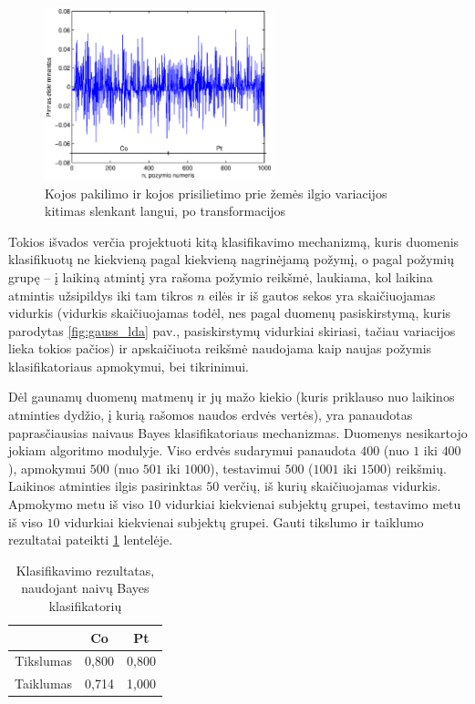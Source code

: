 \documentclass[]{vgtuef}
\begin{document}
\begin{figure}
	\centering
	\includegraphics[width=250px]{figures/11_sample_testing}
	\caption{Kojos pakilimo ir kojos prisilietimo prie žemės ilgio variacijos kitimas slenkant langui, po transformacijos}
	\label{fig:testing_sample}
\end{figure}

Tokios išvados verčia projektuoti kitą klasifikavimo mechanizmą, kuris duomenis klasifikuotų ne kiekvieną pagal kiekvieną nagrinėjamą požymį, o pagal požymių grupę -- į laikiną atmintį yra rašoma požymio reikšmė, laukiama, kol laikina atmintis užsipildys iki tam tikros $n$ eilės ir iš gautos sekos yra skaičiuojamas vidurkis (vidurkis skaičiuojamas todėl, nes pagal duomenų pasiskirstymą, kuris parodytas \ref{fig:gauss_lda} pav., pasiskirstymų vidurkiai skiriasi, tačiau variacijos lieka tokios pačios) ir apskaičiuota reikšmė naudojama kaip naujas požymis klasifikatoriaus apmokymui, bei tikrinimui. 

Dėl gaunamų duomenų matmenų ir jų mažo kiekio (kuris priklauso nuo laikinos atminties dydžio, į kurią rašomos naudos erdvės vertės), yra panaudotas paprasčiausias naivaus Bayes klasifikatoriaus mechanizmas. Duomenys nesikartojo jokiam algoritmo modulyje. Viso erdvės sudarymui panaudota $400$ (nuo $1$ iki $400$), apmokymui $500$ (nuo $501$ iki $1000$), testavimui $500$ ($1001$ iki $1500$) reikšmių. Laikinos atminties ilgis pasirinktas $50$ verčių, iš kurių skaičiuojamas vidurkis. Apmokymo metu iš viso $10$ vidurkiai kiekvienai subjektų grupei, testavimo metu iš viso $10$ vidurkiai kiekvienai subjektų grupei. Gauti tikslumo ir taiklumo rezultatai pateikti \ref{table:classification_results} lentelėje.

\begin{table}
	\centering
	\renewcommand{\arraystretch}{1.3}
	\caption{Klasifikavimo rezultatas, naudojant naivų Bayes klasifikatorių}
	\label{table:classification_results}
	\begin{tabular}{|c|c|c|} \hline
		& Co & Pt \\ \hline
    Tikslumas & 0,800 & 0,800 \\ \hline
    Taiklumas & 0,714 & 1,000 \\ \hline
	\end{tabular}
\end{table}
\end{document}
